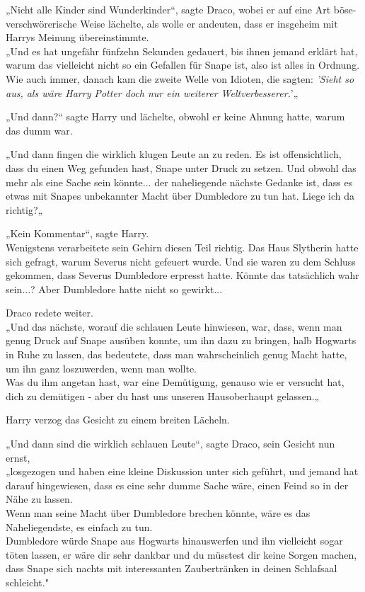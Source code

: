 {„Nicht alle Kinder sind Wunderkinder“, sagte Draco, wobei er auf eine Art böse-verschwörerische Weise lächelte, als wolle er andeuten, dass er insgeheim mit Harrys Meinung übereinstimmte.\\ „Und es hat ungefähr fünfzehn Sekunden gedauert, bis ihnen jemand erklärt hat, warum das vielleicht nicht so ein Gefallen für Snape ist, also ist alles in Ordnung.\\ Wie auch immer, danach kam die zweite Welle von Idioten, die sagten: \emph{'Sieht so aus, als wäre Harry Potter doch nur ein weiterer Weltverbesserer.}'„

„Und dann?“ sagte Harry und lächelte, obwohl er keine Ahnung hatte, warum das dumm war.

„Und dann fingen die wirklich klugen Leute an zu reden. Es ist offensichtlich, dass du einen Weg gefunden hast, Snape unter Druck zu setzen. Und obwohl das mehr als eine Sache sein könnte... der naheliegende nächste Gedanke ist, dass es etwas mit Snapes unbekannter Macht über Dumbledore zu tun hat. Liege ich da richtig?„

„Kein Kommentar“, sagte Harry.\\ Wenigstens verarbeitete sein Gehirn diesen Teil richtig. Das Haus Slytherin hatte sich gefragt, warum Severus nicht gefeuert wurde. Und sie waren zu dem Schluss gekommen, dass Severus Dumbledore erpresst hatte. Könnte das tatsächlich wahr sein...? Aber Dumbledore hatte nicht so gewirkt...

Draco redete weiter.\\ „Und das nächste, worauf die schlauen Leute hinwiesen, war, dass, wenn man genug Druck auf Snape ausüben konnte, um ihn dazu zu bringen, halb Hogwarts in Ruhe zu lassen, das bedeutete, dass man wahrscheinlich genug Macht hatte, um ihn ganz loszuwerden, wenn man wollte.\\ Was du ihm angetan hast, war eine Demütigung, genauso wie er versucht hat, dich zu demütigen - aber du hast uns unseren Hausoberhaupt gelassen.„

Harry verzog das Gesicht zu einem breiten Lächeln.

„Und dann sind die wirklich schlauen Leute“, sagte Draco, sein Gesicht nun ernst,\\ „losgezogen und haben eine kleine Diskussion unter sich geführt, und jemand hat darauf hingewiesen, dass es eine sehr dumme Sache wäre, einen Feind so in der Nähe zu lassen.\\ Wenn man seine Macht über Dumbledore brechen könnte, wäre es das Naheliegendste, es einfach zu tun.\\ Dumbledore würde Snape aus Hogwarts hinauswerfen und ihn vielleicht sogar töten lassen, er wäre dir sehr dankbar und du müsstest dir keine Sorgen machen, dass Snape sich nachts mit interessanten Zaubertränken in deinen Schlafsaal schleicht."

}
